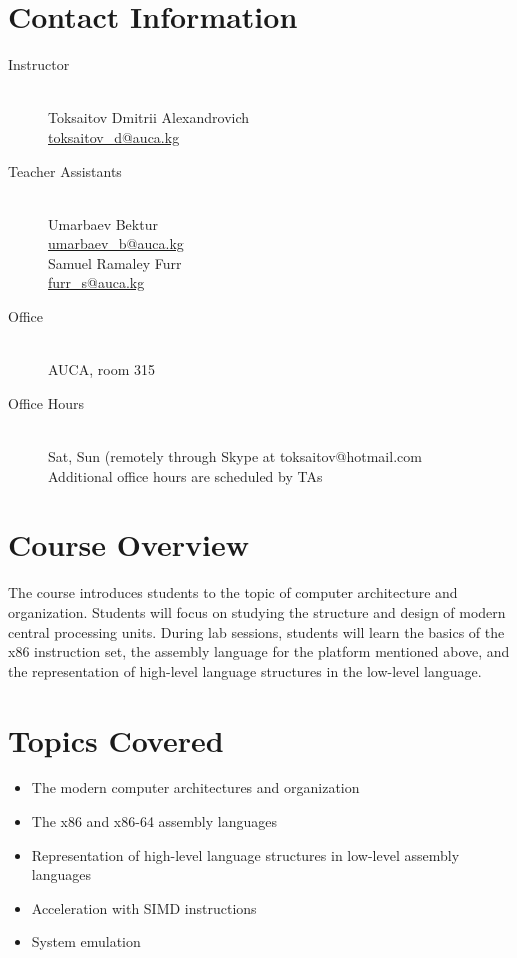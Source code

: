 \documentclass[12pt,a4paper,oneside]{article}
\begin{document}
    \section{Contact Information}

        \begin{description}
            \item[Instructor]\hfill\\
                Toksaitov Dmitrii Alexandrovich\\
                \href{mailto:toksaitov_d@auca.kg}{toksaitov\_d@auca.kg}
            \item[Teacher Assistants]\hfill\\
                Umarbaev Bektur\\
                \href{mailto:umarbaev_b@auca.kg}{umarbaev\_b@auca.kg}\\
                Samuel Ramaley Furr\\
                \href{mailto:furr_s@auca.kg}{furr\_s@auca.kg}
            \item[Office]\hfill\\
                AUCA, room 315
            \item[Office Hours]\hfill\\
                Sat, Sun (remotely through Skype at toksaitov@hotmail.com\\
                Additional office hours are scheduled by TAs
        \end{description}

    \section{Course Overview}

        The course introduces students to the topic of computer architecture and
        organization. Students will focus on studying the structure and design
        of modern central processing units. During lab sessions, students will
        learn the basics of the x86 instruction set, the assembly language for
        the platform mentioned above, and the representation of high-level
        language structures in the low-level language.

    \section{Topics Covered}

        \begin{itemize}
            \item The modern computer architectures and organization
            \item The x86 and x86-64 assembly languages
            \item Representation of high-level language structures in low-level assembly languages
            \item Acceleration with SIMD instructions
            \item System emulation
        \end{itemize}
\end{document}
